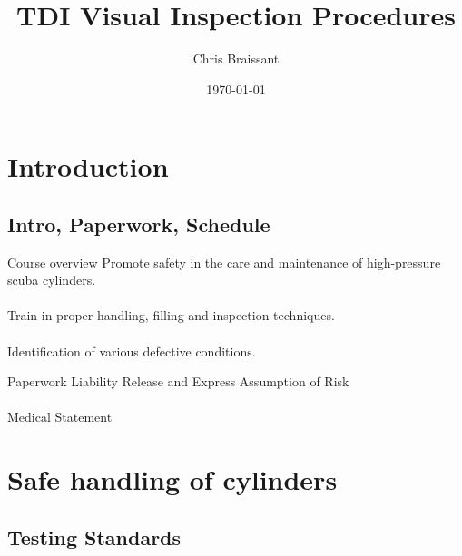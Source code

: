 \documentclass[aspectratio=1610,english,12pt]{beamer}
\author[]{Chris Braissant}
\title[]{TDI Visual Inspection Procedures}
\institute{Ban's Technical Diving }
\date{\today}
\begin{document}
\begin{frame}[plain]
	\maketitle
\end{frame}


\section{Introduction}

\subsection{Intro, Paperwork, Schedule}

\begin{frame}{Course overview}
	Promote safety in the care and maintenance of high-pressure scuba cylinders.\\~\\
	Train in proper handling, filling and inspection techniques.\\~\\
	Identification of various defective conditions.\\
\end{frame}

\begin{frame}{Paperwork}
	Liability Release and Express Assumption of Risk\\~\\
	Medical Statement
\end{frame}

\section{Safe handling of cylinders}

\subsection{Testing Standards}
\end{document}
